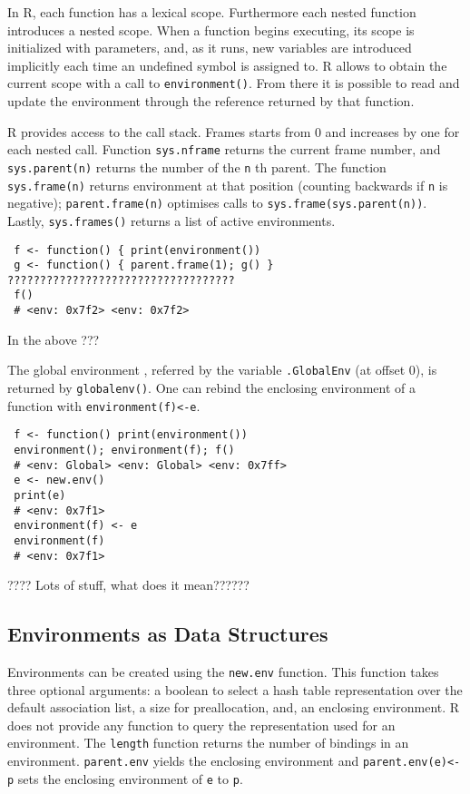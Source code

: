 \documentclass[10pt,review,sigplan,authorversion=true]{acmart}
\newcommand{\code}[1]{\lstinline |#1|\xspace}
\newcommand{\newEnv}{\code{new.env}}
\newcommand{\parentEnv}{\code{parent.env}}
\begin{document}
In R, each function has a lexical scope. Furthermore each nested function
introduces a nested scope. When a function begins executing, its scope is
initialized with parameters, and, as it runs, new variables are introduced
implicitly each time an undefined symbol is assigned to. R allows to obtain the
current scope with a call to \code{environment()}. From there it is possible to
read and update the environment through the reference returned by that function.

R provides access to the call stack. Frames starts from 0 and increases by one
for each nested call. Function \code{sys.nframe} returns the current frame
number, and \code{sys.parent(n)} returns the number of the \code{n}th parent.
The function \code{sys.frame(n)} returns environment at that position (counting
backwards if \code{n} is negative); \code{parent.frame(n)} optimises calls to
\code{sys.frame(sys.parent(n))}. Lastly, \code{sys.frames()} returns a list of
active environments.

\begin{lstlisting}
 f <- function() { print(environment())
 g <- function() { parent.frame(1); g() }  ???????????????????????????????????
 f()
 # <env: 0x7f2> <env: 0x7f2>
\end{lstlisting}

\noindent
In the above ???

The global environment , referred by the variable \code{.GlobalEnv} (at offset
0), is returned by \code{globalenv()}. One can rebind the enclosing environment
of a function with \code{environment(f)<-e}.

\begin{lstlisting}
 f <- function() print(environment())
 environment(); environment(f); f()
 # <env: Global> <env: Global> <env: 0x7ff>
 e <- new.env()
 print(e)
 # <env: 0x7f1>
 environment(f) <- e
 environment(f)
 # <env: 0x7f1>
\end{lstlisting}

???? Lots of stuff, what does it mean??????


\subsection{Environments as Data Structures}

Environments can be created using the \newEnv function. This function takes
three optional arguments: a boolean to select a hash table representation over
the default association list, a size for preallocation, and, an enclosing
environment. R does not provide any function to query the representation used
for an environment. The \code{length} function returns the number of bindings in
an environment. \parentEnv yields the enclosing environment and
\code{parent.env(e)<-p} sets the enclosing environment of \code{e} to \code{p}.
\end{document}
